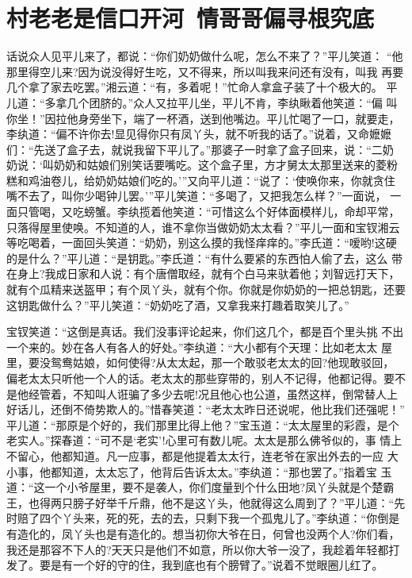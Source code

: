 \chapter{村老老是信口开河~情哥哥偏寻根究底}

话说众人见平儿来了，都说：“你们奶奶做什么呢，怎么不来了？”平儿笑道：
“他那里得空儿来?因为说没得好生吃，又不得来，所以叫我来问还有没有，叫我
再要几个拿了家去吃罢。”湘云道：“有，多着呢！”忙命人拿盒子装了十个极大的。
平儿道：“多拿几个团脐的。”众人又拉平儿坐，平儿不肯，李纨瞅着他笑道：“偏
叫你坐！”因拉他身旁坐下，端了一杯酒，送到他嘴边。平儿忙喝了一口，就要走，
李纨道：“偏不许你去!显见得你只有凤丫头，就不听我的话了。”说着，又命嬷嬷
们：“先送了盒子去，就说我留下平儿了。”那婆子一时拿了盒子回来，说：“二奶
奶说：‘叫奶奶和姑娘们别笑话要嘴吃。这个盒子里，方才舅太太那里送来的菱粉
糕和鸡油卷儿，给奶奶姑娘们吃的。’”又向平儿道：“说了：‘使唤你来，你就贪住
嘴不去了，叫你少喝钟儿罢。’”平儿笑道：“多喝了，又把我怎么样？”一面说，
一面只管喝，又吃螃蟹。李纨揽着他笑道：“可惜这么个好体面模样儿，命却平常，
只落得屋里使唤。不知道的人，谁不拿你当做奶奶太太看？”平儿一面和宝钗湘云
等吃喝着，一面回头笑道：“奶奶，别这么摸的我怪痒痒的。”李氏道：“嗳哟!这硬
的是什么？”平儿道：“是钥匙。”李氏道：“有什么要紧的东西怕人偷了去，这么
带在身上?我成日家和人说：有个唐僧取经，就有个白马来驮着他；刘智远打天下，
就有个瓜精来送盔甲；有个凤丫头，就有个你。你就是你奶奶的一把总钥匙，还要
这钥匙做什么？”平儿笑道：“奶奶吃了酒，又拿我来打趣着取笑儿了。”

宝钗笑道：“这倒是真话。我们没事评论起来，你们这几个，都是百个里头挑
不出一个来的。妙在各人有各人的好处。”李纨道：“大小都有个天理：比如老太太
屋里，要没鸳鸯姑娘，如何使得?从太太起，那一个敢驳老太太的回?他现敢驳回，
偏老太太只听他一个人的话。老太太的那些穿带的，别人不记得，他都记得。要不
是他经管着，不知叫人诳骗了多少去呢!况且他心也公道，虽然这样，倒常替人上
好话儿，还倒不倚势欺人的。”惜春笑道：“老太太昨日还说呢，他比我们还强呢！”
平儿道：“那原是个好的，我们那里比得上他？”宝玉道：“太太屋里的彩霞，是个
老实人。”探春道：“可不是‘老实’!心里可有数儿呢。太太是那么佛爷似的，事
情上不留心，他都知道。凡一应事，都是他提着太太行，连老爷在家出外去的一应
大小事，他都知道，太太忘了，他背后告诉太太。”李纨道：“那也罢了。”指着宝
玉道：“这一个小爷屋里，要不是袭人，你们度量到个什么田地?凤丫头就是个楚霸
王，也得两只膀子好举千斤鼎，他不是这丫头，他就得这么周到了？”平儿道：“先
时赔了四个丫头来，死的死，去的去，只剩下我一个孤鬼儿了。”李纨道：“你倒是
有造化的，凤丫头也是有造化的。想当初你大爷在日，何曾也没两个人?你们看，
我还是那容不下人的?天天只是他们不如意，所以你大爷一没了，我趁着年轻都打
发了。要是有一个好的守的住，我到底也有个膀臂了。”说着不觉眼圈儿红了。

